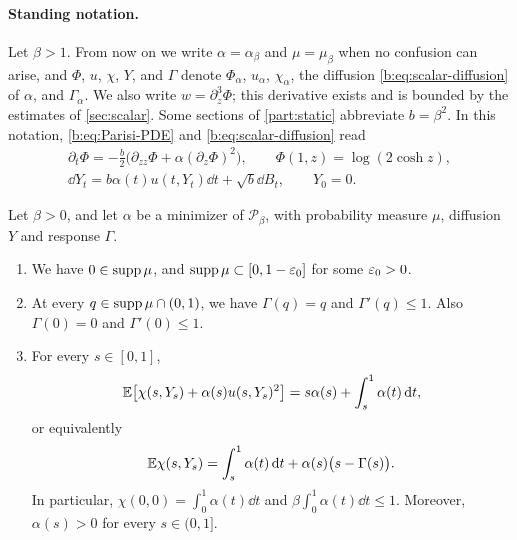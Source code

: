 \paragraph{Standing notation.}
Let $\beta>1$. From now on we write $\alpha=\alpha_\beta$ and $\mu=\mu_\beta$
when no confusion can arise, and $\Phi$, $u$, $\chi$, $Y$, and $\Gamma$ denote
$\Phi_\alpha$, $u_\alpha$, $\chi_\alpha$, the diffusion
\eqref{b:eq:scalar-diffusion} of $\alpha$, and $\Gamma_\alpha$. We also write
$w=\partial_z^3\Phi$; this derivative exists and is bounded by the estimates
of \cref{sec:scalar}. Some sections of \cref{part:static} abbreviate
$b=\beta^2$. In this notation, \eqref{b:eq:Parisi-PDE} and
\eqref{b:eq:scalar-diffusion} read
\begin{equation}\label{b:eq:os-scalar}
\begin{gathered}
 \partial_t\Phi=-\frac b2\bigl(\partial_{zz}\Phi+\alpha(\partial_z\Phi)^2\bigr),\qquad
 \Phi(1,z)=\log(2\cosh z),\\
 \dd Y_t=b\alpha(t)u(t,Y_t)\dd t+\sqrt b\dd B_t,\qquad Y_0=0.
\end{gathered}
\end{equation}

\begin{proposition}\label{inp:ob-stationarity}
Let $\beta>0$, and let $\alpha$ be a minimizer of $\mathcal P_\beta$, with
probability measure $\mu$, diffusion $Y$ and response $\Gamma$.
\begin{enumerate}[label=\textup{(\roman*)}]
\item We have $0\in\operatorname{supp}\mu$, and $\operatorname{supp}\mu\subset[0,1-\varepsilon_0]$ for some
 $\varepsilon_0>0$.
\item At every $q\in\operatorname{supp}\mu\cap(0,1)$, we have $\Gamma(q)=q$ and
 $\Gamma'(q)\le1$. Also $\Gamma(0)=0$ and $\Gamma'(0)\le1$.
\item For every $s\in[0,1]$,
 \begin{equation}\label{eq:inp-stationarity-identity}
  \mathbb E\bigl[\chi(s,Y_s)+\alpha(s)u(s,Y_s)^2\bigr]=s\alpha(s)+\int_s^1\alpha(t)\,\mathrm d t,
 \end{equation}
 or equivalently
 \begin{equation}\label{eq:inp-stationarity}
  \mathbb E\chi(s,Y_s)=\int_s^1\alpha(t)\,\mathrm d t+\alpha(s)\bigl(s-\Gamma(s)\bigr).
 \end{equation}
 In particular, $\chi(0,0)=\int_0^1\alpha(t)\dd t$ and
 $\beta\int_0^1\alpha(t)\dd t\le1$. Moreover, $\alpha(s)>0$ for every $s\in(0,1]$.
\end{enumerate}
\end{proposition}

